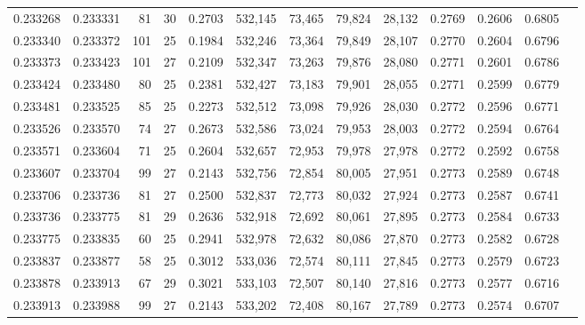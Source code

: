\begin{tabular}{rrrrrrrrrrrrr}
0.233268 & 0.233331 &  81 &  30 &                                     0.2703 & 532,145 &  73,465 &  79,824 &  28,132 & 0.2769 & 0.2606 & 0.6805 \\
0.233340 & 0.233372 & 101 &  25 &                                     0.1984 & 532,246 &  73,364 &  79,849 &  28,107 & 0.2770 & 0.2604 & 0.6796 \\
0.233373 & 0.233423 & 101 &  27 &                                     0.2109 & 532,347 &  73,263 &  79,876 &  28,080 & 0.2771 & 0.2601 & 0.6786 \\
0.233424 & 0.233480 &  80 &  25 &                                     0.2381 & 532,427 &  73,183 &  79,901 &  28,055 & 0.2771 & 0.2599 & 0.6779 \\
0.233481 & 0.233525 &  85 &  25 &                                     0.2273 & 532,512 &  73,098 &  79,926 &  28,030 & 0.2772 & 0.2596 & 0.6771 \\
0.233526 & 0.233570 &  74 &  27 &                                     0.2673 & 532,586 &  73,024 &  79,953 &  28,003 & 0.2772 & 0.2594 & 0.6764 \\
0.233571 & 0.233604 &  71 &  25 &                                     0.2604 & 532,657 &  72,953 &  79,978 &  27,978 & 0.2772 & 0.2592 & 0.6758 \\
0.233607 & 0.233704 &  99 &  27 &                                     0.2143 & 532,756 &  72,854 &  80,005 &  27,951 & 0.2773 & 0.2589 & 0.6748 \\
0.233706 & 0.233736 &  81 &  27 &                                     0.2500 & 532,837 &  72,773 &  80,032 &  27,924 & 0.2773 & 0.2587 & 0.6741 \\
0.233736 & 0.233775 &  81 &  29 &                                     0.2636 & 532,918 &  72,692 &  80,061 &  27,895 & 0.2773 & 0.2584 & 0.6733 \\
0.233775 & 0.233835 &  60 &  25 &                                     0.2941 & 532,978 &  72,632 &  80,086 &  27,870 & 0.2773 & 0.2582 & 0.6728 \\
0.233837 & 0.233877 &  58 &  25 &                                     0.3012 & 533,036 &  72,574 &  80,111 &  27,845 & 0.2773 & 0.2579 & 0.6723 \\
0.233878 & 0.233913 &  67 &  29 &                                     0.3021 & 533,103 &  72,507 &  80,140 &  27,816 & 0.2773 & 0.2577 & 0.6716 \\
0.233913 & 0.233988 &  99 &  27 &                                     0.2143 & 533,202 &  72,408 &  80,167 &  27,789 & 0.2773 & 0.2574 & 0.6707 \\

\end{tabular}
